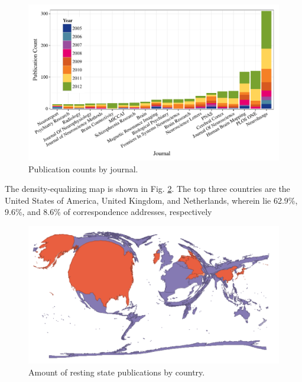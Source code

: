 \documentclass[5p]{elsarticle}
\begin{document}
\begin{figure}
  \begin{center}
    \includegraphics[]{figures/journal_dist}%
    \caption{Publication counts by journal.
        \label{fig:journal_dist}
    }
  \end{center}
\end{figure}


The density-equalizing map is shown in Fig. \ref{fig:resting_state_map}.
The top three countries are the United States of America, United Kingdom,
and Netherlands, wherein lie 62.9\%, 9.6\%, and 8.6\% of correspondence
addresses, respectively

\begin{figure}
  \begin{center}
    \includegraphics[width=\linewidth]{figures/resting_state_map}%
    \caption{Amount of resting state publications by country.
        \label{fig:resting_state_map}
    }
  \end{center}
\end{figure}
\end{document}
